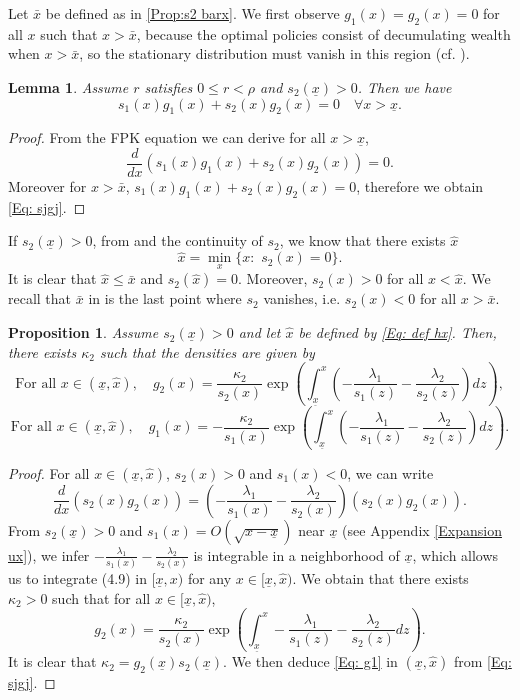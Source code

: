 \documentclass[11pt]{article}
\numberwithin{equation}{section}
\newtheorem{lemma}[thm]{Lemma}
\newtheorem{prop}[thm]{Proposition}
\theoremstyle{definition}
\newcommand{\ux}{{\underline x}}
\newcommand{\beq}{\begin{equation}}
\newcommand{\eeq}{\end{equation}}
\newcommand{\ld}{\lambda}
\newcommand{\lc}{\left(}
\newcommand{\rc}{\right)}
\theoremstyle{plain}
\begin{document}
Let $\bar{x}$ be defined as in \cref{Prop:s2 barx}. We first observe $g_1(x)=g_2(x)=0$ for all $x$ such that $x>\bar{x}$, because the optimal policies consist of decumulating wealth when $x>\bar{x}$, so the stationary distribution must vanish in this region (cf. \cite{meyn2012markov}). 

\begin{lemma}\label{Lemma: sjgj}
Assume $r$ satisfies $0\leq r<\rho$ and $s_2(\ux)>0$. Then we have 
\beq\label{Eq: sjgj}
s_1(x)g_1(x)+s_2(x)g_2(x)=0\quad \forall x>\ux.
\eeq
\end{lemma}
\begin{proof}
From the FPK equation we can derive for all $x>\ux$,
$$
\frac{d}{dx}\lc s_1(x)g_1(x)+s_2(x)g_2(x)\rc =0.
$$
Moreover for $x>\bar{x}$, $s_1(x)g_1(x)+s_2(x)g_2(x)=0$, therefore we obtain \eqref{Eq: sjgj}.
\end{proof}


If $s_2(\ux)>0$, from  and the continuity of $s_2$, we know that there exists $\widehat{x}$
\beq\label{Eq: def hx}
\widehat{x}=\min_{x}\{x:\,\, s_2(x)=0\}.
\eeq
It is clear that $\widehat{x}\leq \bar{x}$ and $s_2(\widehat{x})=0$. Moreover, $s_2(x)>0$ for all $x<\widehat{x}$.
We recall that $\bar{x}$ in  is the last point where $s_2$ vanishes, i.e. $s_2(x)<0$ for all $x>\bar{x}$. 
\begin{prop}\label{Prop: FPK}
Assume $s_2(\ux)>0$ and let $\widehat{x}$ be defined by \eqref{Eq: def hx}. Then, there exists $\kappa_2$ such that the densities are given by 
\beq\label{Eq: g2}
{\text{For all}}\,\, x\in (\ux,\widehat{x}),\quad g_2(x)=\frac{\kappa_2}{s_2(x)}\exp\lc \int_{\ux}^x\lc -\frac{\ld_1}{s_1(z)}-\frac{\ld_2}{s_2(z)}\rc dz\rc,
\eeq
\beq\label{Eq: g1}
{\text{For all}}\,\, x\in (\ux,\widehat{x}),\quad g_1(x)=-\frac{\kappa_2}{s_1(x)}\exp\lc \int_{\ux}^x\lc -\frac{\ld_1}{s_1(z)}-\frac{\ld_2}{s_2(z)}\rc dz\rc.
\eeq
\end{prop}
\begin{proof}
For all $x\in (\ux,\widehat{x})$, $s_2(x)>0$ and $s_1(x)<0$, we can write
\beq\label{Eq: sg}
\frac{d}{dx}\lc s_2(x)g_2(x)\rc=\lc -\frac{\ld_1}{s_1(x)}-\frac{\ld_2}{s_2(x)}\rc \lc s_2(x)g_2(x)\rc.
\eeq
From $s_2(\ux)>0$ and $s_1(x)= O(\sqrt{x-\underline x})$ near $\ux$ (see Appendix \ref{Expansion ux}), we infer $-\frac {\lambda_1} {s_1(x)}-\frac {\lambda_2} {s_2(x)}$ is integrable in a neighborhood of $\ux$, which allows us to integrate (4.9) in $[\underline x, x)$  for any $x\in [\underline x, \widehat{x})$.  We obtain that there exists $\kappa_2>0$ such that for all $x\in  [\underline x, \widehat{x})$,
$$g_2(x) =\frac{\kappa_2} {s_2(x)}\exp\lc{\int_{\ux}^x-\frac {\lambda_1} {s_1(z)} -\frac {\lambda_2} {s_2(z)}dz}\rc.$$
It is clear that $\kappa_2=g_2(\underline x) s_2(\underline x)$.  We then deduce \cref{Eq: g1} in $( \underline x,\widehat{x})$ from \cref{Eq: sjgj}.
\end{proof}
\end{document}
